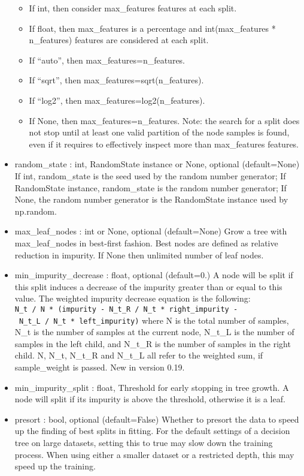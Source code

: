 \documentclass[11pt]{article}
\providecommand{\tightlist}{%
      \setlength{\itemsep}{0pt}\setlength{\parskip}{0pt}}
\begin{document}
\begin{itemize}
  \begin{itemize}
  \tightlist
  \item
    If int, then consider max\_features features at each split.
  \item
    If float, then max\_features is a percentage and int(max\_features *
    n\_features) features are considered at each split.
  \item
    If ``auto'', then max\_features=n\_features.
  \item
    If ``sqrt'', then max\_features=sqrt(n\_features).
  \item
    If ``log2'', then max\_features=log2(n\_features).
  \item
    If None, then max\_features=n\_features. Note: the search for a
    split does not stop until at least one valid partition of the node
    samples is found, even if it requires to effectively inspect more
    than max\_features features. 
  \end{itemize}
\item
  random\_state : int, RandomState instance or None, optional
  (default=None) If int, random\_state is the seed used by the random
  number generator; If RandomState instance, random\_state is the random
  number generator; If None, the random number generator is the
  RandomState instance used by np.random. 
\item
  max\_leaf\_nodes : int or None, optional (default=None) Grow a tree
  with max\_leaf\_nodes in best-first fashion. Best nodes are defined as
  relative reduction in impurity. If None then unlimited number of leaf
  nodes. 
\item
  min\_impurity\_decrease : float, optional (default=0.) A node will be
  split if this split induces a decrease of the impurity greater than or
  equal to this value. The weighted impurity decrease equation is the
  following:
  \texttt{N\_t\ /\ N\ *\ (impurity\ -\ N\_t\_R\ /\ N\_t\ *\ right\_impurity\ -\ N\_t\_L\ /\ N\_t\ *\ left\_impurity)}
  where N is the total number of samples, N\_t is the number of samples
  at the current node, N\_t\_L is the number of samples in the left
  child, and N\_t\_R is the number of samples in the right child. N,
  N\_t, N\_t\_R and N\_t\_L all refer to the weighted sum, if
  sample\_weight is passed. New in version 0.19. 
\item
  min\_impurity\_split : float, Threshold for early stopping in tree
  growth. A node will split if its impurity is above the threshold,
  otherwise it is a leaf. 
\item
  presort : bool, optional (default=False) Whether to presort the data
  to speed up the finding of best splits in fitting. For the default
  settings of a decision tree on large datasets, setting this to true
  may slow down the training process. When using either a smaller
  dataset or a restricted depth, this may speed up the training.
\end{itemize}
\end{document}
